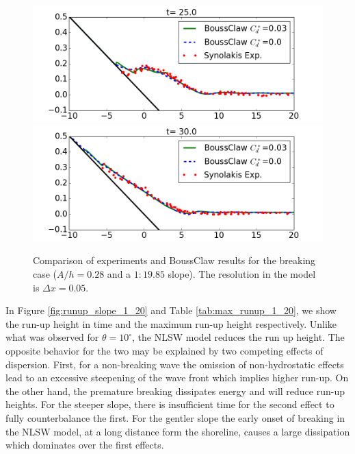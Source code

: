 \documentclass[review]{elsarticle}
\begin{document}
\begin{figure}[tbh!]
	\centering
	\includegraphics[width=.8\textwidth]{_fig/BoussClaw_lab_Cd_t25}\\
	\includegraphics[width=.8\textwidth]{_fig/BoussClaw_lab_Cd_t30}
	\caption{Comparison of experiments and BoussClaw results
                 for the breaking case ($A/h=0.28$ and a $1:19.85$ slope). 
		The resolution in the model is $\Delta x = 0.05$.}
	\label{fig:BoussClaw_runup}
\end{figure}

In Figure \ref{fig:runup_slope_1_20} and Table \ref{tab:max_runup_1_20},
we show the run-up height in time and the maximum run-up height respectively.
Unlike what was observed for $\theta=10^\circ$, the NLSW model
reduces the run up height. 
The opposite behavior for the two may be 
explained by two competing effects of dispersion. 
First, for a non-breaking wave the omission of non-hydrostatic effects 
lead to an excessive 
steepening of the wave front which implies higher run-up. 
On the other hand, 
the premature breaking dissipates energy and will reduce run-up heights. 
For the steeper slope, 
there is insufficient time for the second effect to fully 
counterbalance the first. 
For the gentler slope the early onset of breaking
in the NLSW model, at a long distance form the shoreline, causes a large 
dissipation which dominates over the first effects.
\end{document}
